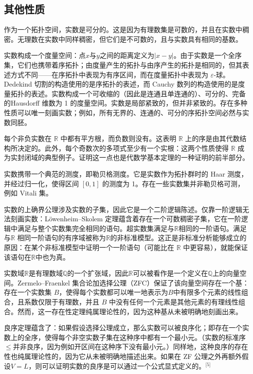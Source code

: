 \subsection{其他性质}
作为一个拓扑空间，实数是可分的。这是因为有理数集是可数的，并且在实数中稠密。无理数在实数中同样稠密，但它们是不可数的，且与实数具有相同的基数。

实数构成一个度量空间：点$x$与$y$之间的距离定义为$|x-y|$。由于实数是一个全序集，它们也携带着序拓扑；由度量产生的拓扑与由序产生的拓扑是相同的，但其表述方式不同——在序拓扑中表现为有序区间，而在度量拓扑中表现为 $\varepsilon$-球。Dedekind 切割的构造使用的是序拓扑的表述，而 Cauchy 数列的构造使用的是度量拓扑的表述。实数构成一个可收缩的（因此是连通且单连通的）、可分的、完备的Hausdorff 维数为 1 的度量空间。实数是局部紧致的，但并非紧致的。存在多种性质可以唯一刻画实数；例如，所有无界的、连通的、可分的序拓扑空间必然与实数同胚。

每个非负实数在 $\mathbb{R}$ 中都有平方根，而负数则没有。这表明 $\mathbb{R}$ 上的序是由其代数结构所决定的。此外，每个奇数次的多项式至少有一个实根：这两个性质使得 $\mathbb{R}$ 成为实封闭域的典型例子。证明这一点也是代数学基本定理的一种证明的前半部分。

实数携带一个典范的测度，即勒贝格测度。它是实数作为拓扑群时的 Haar 测度，并经过归一化，使得区间 $[0,1]$ 的测度为 1。存在一些实数集并非勒贝格可测，例如 Vitali 集。

实数的上确界公理涉及实数的子集，因此它是一个二阶逻辑陈述。仅靠一阶逻辑无法刻画实数：Löwenheim–Skolem 定理蕴含着存在一个可数稠密子集，它在一阶逻辑中满足与整个实数集完全相同的语句。超实数集满足与$\mathbb{R}$相同的一阶语句。满足与$\mathbb{R}$ 相同一阶语句的有序域被称为$\mathbb{R}$的非标准模型。这正是非标准分析能够成立的原因：在某个非标准模型中证明一个一阶语句（可能比在 $\mathbb{R}$ 中更容易），就能保证该语句在$\mathbb{R}$中也为真。

实数域$\mathbb{R}$是有理数域$\mathbb{Q}$的一个扩张域，因此$\mathbb{R}$可以被看作是一个定义在$\mathbb{Q}$上的向量空间。Zermelo–Fraenkel 集合论加选择公理（ZFC）保证了该向量空间存在一个基：存在一个实数集 $B$，使得每个实数都可以唯一地表示为$B$中有限多个元素的线性组合，且系数仅限于有理数，并且 $B$ 中没有任何一个元素是其他元素的有理线性组合。然而，这一存在性定理纯属理论性的，因为这种基从未被明确地刻画出来。

良序定理蕴含了：如果假设选择公理成立，那么实数可以被良序化；即存在一个实数上的全序，使得每个非空实数子集在这种序中都有一个最小元。（实数的标准序$\leq$并非良序，因为例如开区间在这种序下没有最小元。）同样地，这种良序的存在性也纯属理论性的，因为它从未被明确地描述出来。如果在 ZF 公理之外再额外假设$V=L$，则可以证明实数的良序是可以通过一个公式显式定义的。\(^\text{[5]}\)

